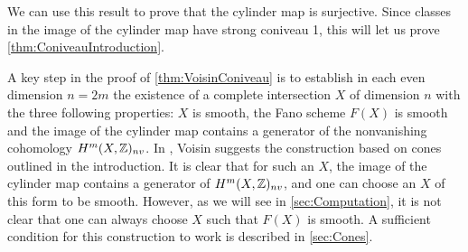 
We can use this result to prove that the cylinder map is surjective. Since classes in the image of the cylinder map have strong coniveau 1,  this will let us prove \cref{thm:ConiveauIntroduction}.

A key step in the proof of \cref{thm:VoisinConiveau} is to establish in each even dimension $n = 2m$ the existence of a complete intersection $X$ of dimension $n$ with the three following properties: $X$ is smooth, the Fano scheme $F(X)$ is smooth and the image of the cylinder map contains a generator of the nonvanishing cohomology $H^{m}(X,\mathbb{Z})_{nv}$. In \cite{VoisinConiveauThreefolds}, Voisin suggests the construction based on cones outlined in the introduction. It is clear that for such an $X$, the image of the cylinder map contains a generator of $H^{m}(X,\mathbb{Z})_{nv}$, and one can choose an $X$ of this form to be smooth. However, as we will see in \cref{sec:Computation}, it is not clear that one can always choose $X$ such that $F(X)$ is smooth. A sufficient condition for this construction to work is described in \cref{sec:Cones}.

